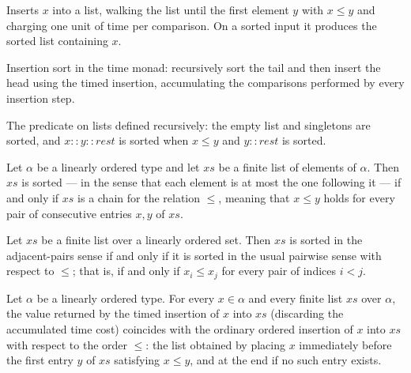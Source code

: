 \begin{definition}
\label{insert}
\leanok
Inserts $x$ into a list, walking the list until the first element $y$ with $x \le y$ and charging
one unit of time per comparison. On a sorted input it produces the sorted list containing $x$.
\end{definition}

\begin{definition}
\label{insertionSort}
\leanok
{}
Insertion sort in the time monad: recursively sort the tail and then insert the head using the
timed insertion, accumulating the comparisons performed by every insertion step.
\end{definition}

\begin{definition}
\label{IsSorted}
\leanok
The predicate on lists defined recursively: the empty list and singletons are sorted, and
$x :: y :: \mathit{rest}$ is sorted when $x \le y$ and $y :: \mathit{rest}$ is sorted.
\end{definition}

\begin{theorem}
\label{isSorted_iff_isChain}
\leanok
{}
Let $\alpha$ be a linearly ordered type and let $\mathit{xs}$ be a finite list of
elements of $\alpha$. Then $\mathit{xs}$ is sorted — in the sense that each element is
at most the one following it — if and only if $\mathit{xs}$ is a chain for the relation
$\le$, meaning that $x \le y$ holds for every pair of consecutive entries $x, y$ of
$\mathit{xs}$.
\end{theorem}

\begin{theorem}
\label{isSorted_iff_sorted}
\leanok
{}
Let $\mathit{xs}$ be a finite list over a linearly ordered set. Then $\mathit{xs}$ is
sorted in the adjacent-pairs sense if and only if it is sorted in the usual pairwise
sense with respect to $\le$; that is, if and only if $x_i \le x_j$ for every pair of
indices $i < j$.
\end{theorem}

\begin{theorem}
\label{ret_insert}
\leanok
{}
Let $\alpha$ be a linearly ordered type. For every $x \in \alpha$ and every finite list
$\mathit{xs}$ over $\alpha$, the value returned by the timed insertion of $x$ into
$\mathit{xs}$ (discarding the accumulated time cost) coincides with the ordinary ordered
insertion of $x$ into $\mathit{xs}$ with respect to the order $\le$: the list obtained
by placing $x$ immediately before the first entry $y$ of $\mathit{xs}$ satisfying $x \le
y$, and at the end if no such entry exists.
\end{theorem}

